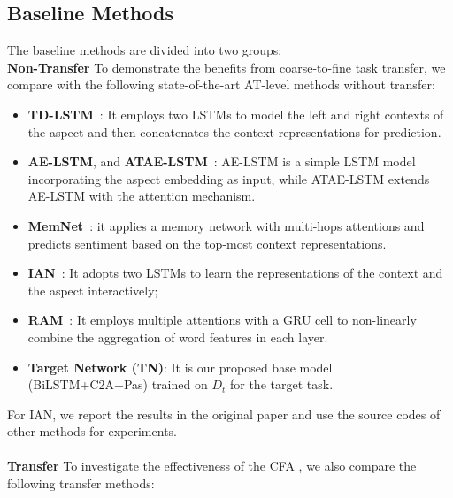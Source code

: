 \documentclass[letterpaper]{article} \usepackage{aaai19}  \usepackage{times}  \usepackage{latexsym}
\begin{document}
\vspace{-2mm}
\subsection{Baseline Methods}
The baseline methods are divided into two groups:\\
\noindent \textbf{Non-Transfer} To demonstrate the benefits from coarse-to-fine task transfer, we compare with the following state-of-the-art AT-level methods without transfer: 
\begin{itemize}
\item \textbf{TD-LSTM}~\cite{tang2015effective}: It employs two LSTMs to model the left and right contexts of the aspect and then concatenates the context representations for prediction.
\item \textbf{AE-LSTM}, and \textbf{ATAE-LSTM}~\cite{wang2016attention}: AE-LSTM is a simple LSTM model incorporating the aspect embedding as input, while ATAE-LSTM extends AE-LSTM with the attention mechanism.
\item \textbf{MemNet}~\cite{tang2016aspect}: it applies a memory network with multi-hops attentions and predicts sentiment based on the top-most context representations.

\item \textbf{IAN}~\cite{ma2017interactive}: It adopts two LSTMs to learn the representations of the context and the aspect interactively; 
\item \textbf{RAM}~\cite{chen2017recurrent}: It employs multiple attentions with a GRU cell to non-linearly combine the aggregation of word features in each layer. 
\item \textbf{Target Network (TN)}: It is our proposed base model (BiLSTM+C2A+Pas) trained on ${D}_{t}$ for the target task.
\end{itemize}
For IAN, we report the results in the original paper and use the source codes of other methods for experiments. \vspace{-2mm}
\\\\
\noindent \textbf{Transfer} To investigate the effectiveness of the CFA , we also compare the following transfer methods:
\end{document}
